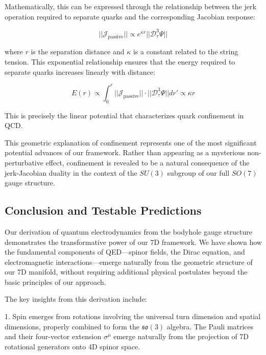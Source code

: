 \documentclass{article}
\begin{document}
Mathematically, this can be expressed through the relationship between the jerk operation required to separate quarks and the corresponding Jacobian response:

\begin{equation}
|| \mathcal{J}_{\text{passive}} || \propto e^{\kappa r} || \mathcal{D}_\tau^3 \Psi ||
\end{equation}

where $r$ is the separation distance and $\kappa$ is a constant related to the string tension. This exponential relationship ensures that the energy required to separate quarks increases linearly with distance:

\begin{equation}
E(r) \propto \int_0^r || \mathcal{J}_{\text{passive}} || \cdot || \mathcal{D}_\tau^3 \Psi || dr' \propto \kappa r
\end{equation}

This is precisely the linear potential that characterizes quark confinement in QCD.

This geometric explanation of confinement represents one of the most significant potential advances of our framework. Rather than appearing as a mysterious non-perturbative effect, confinement is revealed to be a natural consequence of the jerk-Jacobian duality in the context of the $SU(3)$ subgroup of our full $SO(7)$ gauge structure.

\subsection{Conclusion and Testable Predictions}

Our derivation of quantum electrodynamics from the bodyhole gauge structure demonstrates the transformative power of our 7D framework. We have shown how the fundamental components of QED—spinor fields, the Dirac equation, and electromagnetic interactions—emerge naturally from the geometric structure of our 7D manifold, without requiring additional physical postulates beyond the basic principles of our approach.

The key insights from this derivation include:

1. Spin emerges from rotations involving the universal turn dimension and spatial dimensions, properly combined to form the $\mathfrak{so}(3)$ algebra. The Pauli matrices and their four-vector extension $\sigma^\mu$ emerge naturally from the projection of 7D rotational generators onto 4D spinor space.
\end{document}
